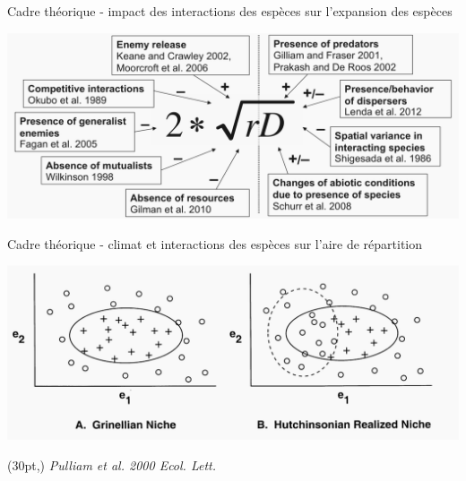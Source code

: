 \documentclass[11pt, compress, aspectratio=1610]{beamer}
\newcommand\smallcitation[1]{%
\begin{textblock*}{\textwidth}(30pt,\textheight)
	\raggedleft \footnotesize\textit{#1}
\end{textblock*}}
\begin{document}
\begin{frame}{Cadre théorique - impact des interactions des espèces sur
l’expansion des espèces}
\protect\hypertarget{cadre-thuxe9orique---impact-des-interactions-des-espuxe8ces-sur-lexpansion-des-espuxe8ces}{}

\centering

\includegraphics[scale=0.48]{figures/Svenning2014.png}

\par

\end{frame}

\begin{frame}{Cadre théorique - climat et interactions des espèces sur
l’aire de répartition}
\protect\hypertarget{cadre-thuxe9orique---climat-et-interactions-des-espuxe8ces-sur-laire-de-ruxe9partition}{}

\centering

\includegraphics[scale=0.45]{figures/Pulliam2000.png}

\par

\smallcitation{Pulliam et al. 2000 Ecol. Lett.}

\end{frame}
\end{document}
